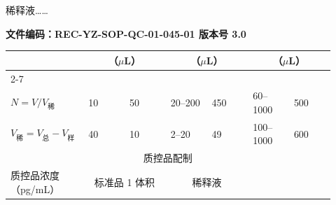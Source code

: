 \documentclass[UTF8,10pt,a4paper,fontset=fandol]{ctexart}
\newcommand{\fieldvalue}[1]{#1}
\newcommand{\handwritten}[1]{#1}
\begin{document}
\fieldvalue{\handwritten{稀释液……}}


\newpage

\begin{center}
\textbf{文件编码：REC-YZ-SOP-QC-01-045-01 \quad 版本号 3.0}
\end{center}

\begin{tabular}{|p{0.20\linewidth}|p{0.12\linewidth}|p{0.12\linewidth}|p{0.12\linewidth}|p{0.12\linewidth}|p{0.12\linewidth}|p{0.12\linewidth}|}
\hline
 & \multicolumn{2}{c|}{（$\mu$L）} & \multicolumn{2}{c|}{（$\mu$L）} & \multicolumn{2}{c|}{（$\mu$L）} \\
\cline{2-7}
 & & & & & & \\
\hline
$N=V/V_{\text{稀}}$ & 
\fieldvalue{\handwritten{10}} &
\fieldvalue{\handwritten{50}} &
\fieldvalue{\handwritten{20--200}} &
\fieldvalue{\handwritten{450}} &
\fieldvalue{\handwritten{60--1000}} &
\fieldvalue{\handwritten{500}} \\
\hline
$V_{\text{稀}}=V_{\text{总}}-V_{\text{样}}$ &
\fieldvalue{\handwritten{40}} &
\fieldvalue{\handwritten{10}} &
\fieldvalue{\handwritten{2--20}} &
\fieldvalue{\handwritten{49}} &
\fieldvalue{\handwritten{100--1000}} &
\fieldvalue{\handwritten{600}} \\
\hline
\multicolumn{7}{|c|}{质控品配制} \\
\hline
质控品浓度（pg/mL） &
\multicolumn{2}{c|}{标准品 1 体积} &
\multicolumn{2}{c|}{稀释液} &

\end{tabular}
\end{document}
